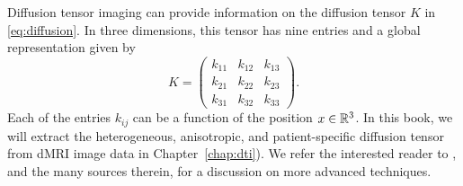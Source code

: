 Diffusion tensor imaging can provide information on the diffusion
tensor $K$ in \eqref{eq:diffusion}. In three dimensions, this 
tensor has nine entries and a global representation given by
\begin{equation}
K = \begin{pmatrix}
  k_{11} & k_{12} & k_{13} \\
  k_{21} & k_{22} & k_{23} \\
  k_{31} & k_{32} & k_{33}
\end{pmatrix}.
\end{equation}
Each of the entries $k_{ij}$ can be a function of the position $x \in
\mathbb{R}^3$. In this book, we will extract the heterogeneous, anisotropic,
and patient-specific diffusion tensor from dMRI image data in
Chapter~\ref{chap:dti}). We refer the interested reader to
\cite{jeurissen2017}, and the many sources therein, for a discussion
on more advanced techniques.





